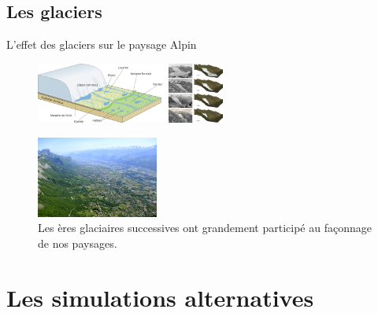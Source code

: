 \documentclass{beamer}
\begin{document}
\subsection{Les glaciers}
\begin{frame}{L'effet des glaciers sur le paysage Alpin}
  \begin{center}
    \begin{figure}
      \includegraphics[height=2cm]{Images/Images_Alexis/glacier_reculon.png}
      \includegraphics[height=2cm]{Images/Images_Alexis/glaciers_img3.png}
      \caption{Les ères glaciaires successives ont grandement participé au façonnage de nos paysages.}
      \includegraphics[width=4cm]{Images/Images_Alexis/gresivaudan.jpg}
    \end{figure}
  \end{center}
\end{frame}


\section{Les simulations alternatives}
\end{document}
